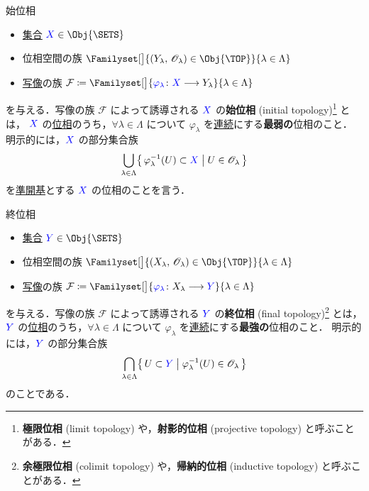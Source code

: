 \documentclass[geometry_main]{subfiles}
\begin{document}
\begin{mydef}[label=def:initial-topo, breakable]{始位相}
	\begin{itemize}
		\item \underline{集合} $\textcolor{blue}{X} \in \Obj{\SETS}$
		\item 位相空間の族 $\Familyset[\big]{(Y_\lambda,\, \mathscr{O}_\lambda) \in \Obj{\TOP}}{\lambda \in \Lambda}$
		\item \underline{写像}の族 $\mathcal{F} \coloneqq \Familyset[\big]{\textcolor{blue}{\varphi_\lambda} \colon \textcolor{blue}{X} \lto Y_\lambda}{\lambda \in \Lambda}$
	\end{itemize}
	を与える．写像の族 $\mathcal{F}$ によって誘導される $\textcolor{blue}{X}$ の\textbf{始位相} (initial topology)\footnote{\textbf{極限位相} (limit topology) や，\textbf{射影的位相} (projective topology) と呼ぶことがある．} とは，
	$\textcolor{blue}{X}$ の\hyperref[ax.topo]{位相}のうち，$\forall \lambda \in \Lambda$ について $\varphi_\lambda$ を\hyperref[def.continuous]{連続}にする\textbf{最弱の}位相のこと．
	\tcblower
	明示的には，$\textcolor{blue}{X}$ の部分集合族
	\begin{align}
		\bigcup_{\lambda \in \Lambda} \bigl\{\, \varphi_\lambda^{-1}(U) \subset \textcolor{blue}{X} \bigm| U \in \mathscr{O}_\lambda \,\bigr\} 
	\end{align}
	を\hyperref[def:subbase]{準開基}とする $\textcolor{blue}{X}$ の位相のことを言う．
\end{mydef}

\begin{mydef}[label=def:final-topo, breakable]{終位相}
	\begin{itemize}
		\item \underline{集合} $\textcolor{blue}{Y} \in \Obj{\SETS}$
		\item 位相空間の族 $\Familyset[\big]{(X_\lambda,\, \mathscr{O}_\lambda) \in \Obj{\TOP}}{\lambda \in \Lambda}$
		\item \underline{写像}の族 $\mathcal{F} \coloneqq \Familyset[\big]{\textcolor{blue}{\varphi_\lambda} \colon X_\lambda \lto \textcolor{blue}{Y}}{\lambda \in \Lambda}$
	\end{itemize}
	を与える．写像の族 $\mathcal{F}$ によって誘導される $\textcolor{blue}{Y}$ の\textbf{終位相} (final topology)\footnote{\textbf{余極限位相} (colimit topology) や，\textbf{帰納的位相} (inductive topology) と呼ぶことがある．} とは，
	$\textcolor{blue}{Y}$ の\hyperref[ax.topo]{位相}のうち，$\forall \lambda \in \Lambda$ について $\varphi_\lambda$ を\hyperref[def.continuous]{連続}にする\textbf{最強の}位相のこと．
	\tcblower
	明示的には，$\textcolor{blue}{Y}$ の部分集合族
	\begin{align}
		\bigcap_{\lambda \in \Lambda} \bigl\{\, U \subset \textcolor{blue}{Y} \bigm| \varphi_\lambda^{-1} (U) \in \mathscr{O}_\lambda\,\bigr\} 
	\end{align}
	のことである．
\end{mydef}
\end{document}
